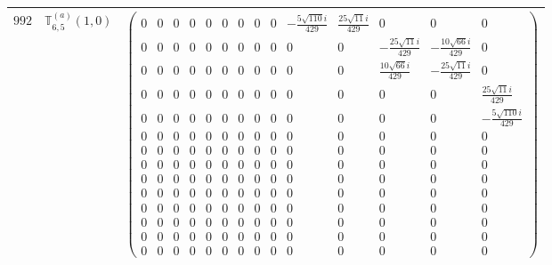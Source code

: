 \documentclass[fleqn,8pt,landscape]{jsarticle}
\begin{document}
\begin{center}
\begin{longtable}{ccc}
$ 992 $ & $ \mathbb{T}_{6,5}^{(a)}(1,0) $ & $ \begin{pmatrix} 0 & 0 & 0 & 0 & 0 & 0 & 0 & 0 & 0 & - \frac{5 \sqrt{110} i}{429} & \frac{25 \sqrt{11} i}{429} & 0 & 0 & 0 \\ 0 & 0 & 0 & 0 & 0 & 0 & 0 & 0 & 0 & 0 & 0 & - \frac{25 \sqrt{11} i}{429} & - \frac{10 \sqrt{66} i}{429} & 0 \\ 0 & 0 & 0 & 0 & 0 & 0 & 0 & 0 & 0 & 0 & 0 & \frac{10 \sqrt{66} i}{429} & - \frac{25 \sqrt{11} i}{429} & 0 \\ 0 & 0 & 0 & 0 & 0 & 0 & 0 & 0 & 0 & 0 & 0 & 0 & 0 & \frac{25 \sqrt{11} i}{429} \\ 0 & 0 & 0 & 0 & 0 & 0 & 0 & 0 & 0 & 0 & 0 & 0 & 0 & - \frac{5 \sqrt{110} i}{429} \\ 0 & 0 & 0 & 0 & 0 & 0 & 0 & 0 & 0 & 0 & 0 & 0 & 0 & 0 \\ 0 & 0 & 0 & 0 & 0 & 0 & 0 & 0 & 0 & 0 & 0 & 0 & 0 & 0 \\ 0 & 0 & 0 & 0 & 0 & 0 & 0 & 0 & 0 & 0 & 0 & 0 & 0 & 0 \\ 0 & 0 & 0 & 0 & 0 & 0 & 0 & 0 & 0 & 0 & 0 & 0 & 0 & 0 \\ 0 & 0 & 0 & 0 & 0 & 0 & 0 & 0 & 0 & 0 & 0 & 0 & 0 & 0 \\ 0 & 0 & 0 & 0 & 0 & 0 & 0 & 0 & 0 & 0 & 0 & 0 & 0 & 0 \\ 0 & 0 & 0 & 0 & 0 & 0 & 0 & 0 & 0 & 0 & 0 & 0 & 0 & 0 \\ 0 & 0 & 0 & 0 & 0 & 0 & 0 & 0 & 0 & 0 & 0 & 0 & 0 & 0 \\ 0 & 0 & 0 & 0 & 0 & 0 & 0 & 0 & 0 & 0 & 0 & 0 & 0 & 0 \end{pmatrix} $ \\ \hline

\end{longtable}
\end{center}
\end{document}

